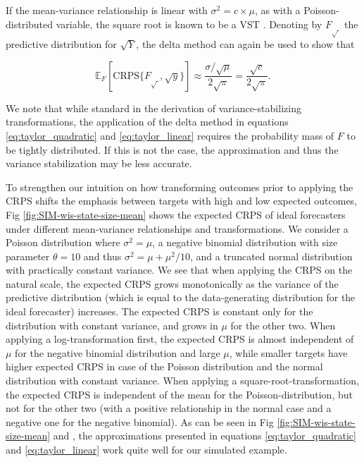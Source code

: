 \documentclass[10pt,letterpaper]{article}
\begin{document}
If the mean-variance relationship is linear with $\sigma^2 = c \times \mu$, as with a Poisson-distributed variable, the square root is known to be a VST \cite{dunnGeneralizedLinearModels2018}. 
Denoting by $F_{\sqrt{\ }}$ the predictive distribution for $\sqrt{Y}$, the delta method can again be used to show that
\begin{linenomath*}
\begin{equation}
\mathbb{E}_F[\text{CRPS}\{F_{\sqrt{\ }}, \sqrt{y}\}] \approx \frac{\sigma/\sqrt{\mu}}{2\sqrt{\pi}} = \frac{\sqrt{c}}{2\sqrt{\pi}}
.\label{eq:taylor_linear}
\end{equation}
\end{linenomath*}
We note that while standard in the derivation of variance-stabilizing transformations, the application of the delta method in equations \eqref{eq:taylor_quadratic} and \eqref{eq:taylor_linear} requires the probability mass of $F$ to be tightly distributed. If this is not the case, the approximation and thus the variance stabilization may be less accurate.

To strengthen our intuition on how transforming outcomes prior to applying the CRPS shifts the emphasis between targets with high and low expected outcomes, Fig \ref{fig:SIM-wis-state-size-mean} shows the expected CRPS of ideal forecasters under different mean-variance relationships and transformations. We consider a Poisson distribution where $\sigma^2 = \mu$, a negative binomial distribution with size parameter $\theta = 10$ and thus $\sigma^2 = \mu + \mu^2/10$, and a truncated normal distribution with practically constant variance. We see that when applying the CRPS on the natural scale, the expected CRPS grows monotonically as the variance of the predictive distribution (which is equal to the data-generating distribution for the ideal forecaster) increases. The expected CRPS is constant only for the distribution with constant variance, and grows in $\mu$ for the other two. When applying a log-transformation first, the expected CRPS is almost independent of $\mu$ for the negative binomial distribution and large $\mu$, while smaller targets have higher expected CRPS in case of the Poisson distribution and the normal distribution with constant variance. When applying a square-root-transformation, the expected CRPS is independent of the mean for the Poisson-distribution, but not for the other two (with a positive relationship in the normal case and a negative one for the negative binomial). As can be seen in Fig \ref{fig:SIM-wis-state-size-mean} and , the approximations presented in equations \eqref{eq:taylor_quadratic} and \eqref{eq:taylor_linear} work quite well for our simulated example. 
\end{document}
